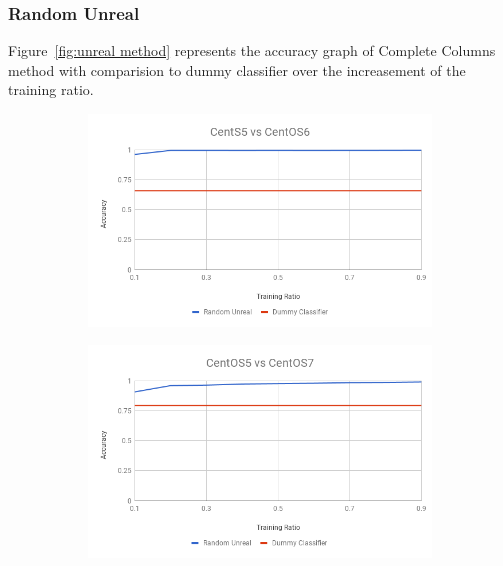 \documentclass[10pt, conference, compsocconf]{IEEEtran}
\begin{document}
\subsubsection{Random Unreal}
Figure~\ref{fig:unreal method} represents
the accuracy graph of Complete Columns method with comparision to dummy
classifier over the increasement of the training ratio.
\begin{figure}[h!]
        \centering
        \begin{subfigure}[b]{0.8\linewidth}
                \includegraphics[width=\columnwidth]{figures/ALS/unreal-ALS-5vs6-PFS}
        \end{subfigure}
        \begin{subfigure}[b]{0.8\linewidth}
                \includegraphics[width=\columnwidth]{figures/ALS/unreal-ALS-5vs7-PFS}
        \end{subfigure}
        \begin{subfigure}[b]{0.8\linewidth}

\end{subfigure}
\end{figure}
\end{document}
